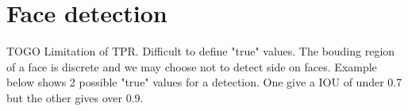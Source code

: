 \documentclass{article}
\begin{document}
\section{Face detection}

\begin{multicols}{2}

TOGO
Limitation of TPR. Difficult to define "true" values. The bouding region of a
face is discrete and we may choose not to detect side on faces. Example below
shows 2 possible "true" values for a detection. One give a IOU of under 0.7 but
the other gives over 0.9.

\end{multicols}
\end{document}

